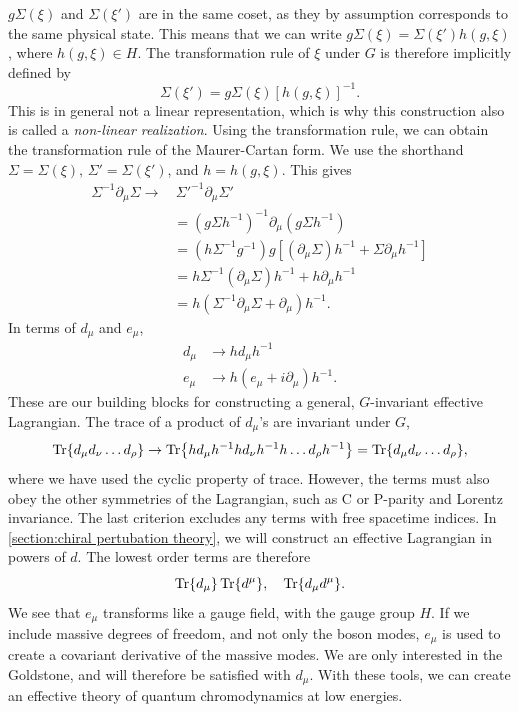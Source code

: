 $g\Sigma(\xi)$ and $\Sigma(\xi')$ are in the same coset, as they by assumption corresponds to the same physical state.
This means that we can write $g\Sigma(\xi) = \Sigma(\xi') h(g, \xi)$, where $h(g, \xi) \in H$.
The transformation rule of $\xi$ under $G$ is therefore implicitly defined by
\begin{equation}
    \Sigma(\xi') = g \Sigma(\xi) [h(g, \xi)]^{-1}.
\end{equation}
This is in general not a linear representation, which is why this construction also is called a \emph{non-linear realization}.
Using the transformation rule, we can obtain the transformation rule of the Maurer-Cartan form.
We use the shorthand $\Sigma = \Sigma(\xi),\, \Sigma' = \Sigma(\xi')$, and $h = h(g, \xi)$.
This gives
\begin{align*}
    \Sigma^{-1} \partial_\mu \Sigma
    \rightarrow 
    & \, \Sigma'^{-1} \partial_\mu \Sigma' \\
    & = (g \Sigma h^{-1})^{-1} \partial_\mu (g \Sigma h^{-1}) \\
    & = (h \Sigma^{-1} g^{-1}) g [(\partial_\mu \Sigma)h^{-1} + \Sigma \partial_\mu h^{-1}] \\
    & = h \Sigma^{-1} (\partial_\mu \Sigma) h^{-1}
    + h \partial_\mu h^{-1} \\
    & = h (\Sigma^{-1} \partial_\mu \Sigma + \partial_\mu) h^{-1}.
\end{align*}
In terms of $d_\mu$ and $e_\mu$,
\begin{align}
    d_\mu & \rightarrow h d_\mu h^{-1} \\
    e_\mu & \rightarrow h (e_\mu + i\partial_\mu )h^{-1}.
\end{align}
These are our building blocks for constructing a general, $G$-invariant effective Lagrangian.
The trace of a product of $d_\mu$'s are invariant under $G$,
\begin{equation}
    \Tr{d_\mu d_\nu \dots d_\rho} 
    \rightarrow
    \Tr{h d_\mu h^{-1} h d_\nu h^{-1} h \dots d_\rho h^{-1}}
    = \Tr{d_\mu d_\nu \dots d_\rho},
\end{equation}
where we have used the cyclic property of trace.
However, the terms must also obey the other symmetries of the Lagrangian, such as C or P-parity and Lorentz invariance.
The last criterion excludes any terms with free spacetime indices.
In \autoref{section:chiral pertubation theory}, we will construct an effective Lagrangian in powers of $d$.
The lowest order terms are therefore
\begin{equation}
    \label{first order terms CCWZ}
    \Tr{d_\mu} \Tr{d^\mu}, 
    \quad 
    \Tr{d_\mu d^\mu}.
\end{equation}
We see that $e_\mu$ transforms like a gauge field, with the gauge group $H$.
If we include massive degrees of freedom, and not only the boson modes, $e_\mu$ is used to create a covariant derivative of the massive modes.
We are only interested in the Goldstone, and will therefore be satisfied with $d_\mu$.
With these tools, we can create an effective theory of quantum chromodynamics at low energies.

